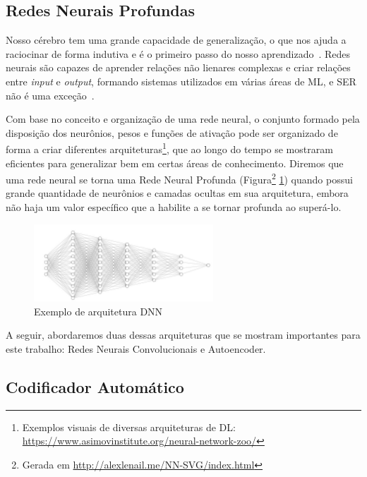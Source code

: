\subsection{Redes Neurais Profundas}

Nosso cérebro tem uma grande capacidade de generalização, o que nos ajuda a raciocinar de forma indutiva e é o primeiro passo do nosso aprendizado~\cite{32}. Redes neurais são capazes de aprender relações não lienares complexas e criar relações entre \textit{input} e \textit{output}, formando sistemas utilizados em várias áreas de \acrshort{ML}, e \acrshort{SER} não é uma exceção~\cite{32.74}.

Com base no conceito e organização de uma rede neural, o conjunto formado pela disposição dos neurônios, pesos e funções de ativação pode ser organizado de forma a criar diferentes arquiteturas\footnote{Exemplos visuais de diversas arquiteturas de DL: \url{https://www.asimovinstitute.org/neural-network-zoo/}}, que ao longo do tempo se mostraram eficientes para generalizar bem em certas áreas de conhecimento. Diremos que uma rede neural se torna uma Rede Neural Profunda (Figura\footnote{Gerada em \url{http://alexlenail.me/NN-SVG/index.html}} \ref{fig:exarqdnn}) quando possui grande quantidade de neurônios e camadas ocultas em sua arquitetura, embora não haja um valor específico que a habilite a se tornar profunda ao superá-lo.

\begin{figure}[!h]
\centering
\includegraphics[width=0.6\textwidth]{img/ex-dnn.JPG}
\caption{\label{fig:exarqdnn}Exemplo de arquitetura \acrlong{DNN}}
\end{figure}

A seguir, abordaremos duas dessas arquiteturas que se mostram importantes para este trabalho: Redes Neurais Convolucionais e Autoencoder.

\subsection{Codificador Automático}

